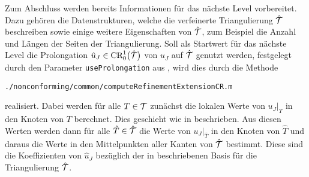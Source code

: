Zum Abschluss werden bereits Informationen für das nächste Level vorbereitet. 
Dazu gehören die Datenstrukturen, welche die verfeinerte Triangulierung
$\hat{\mathcal{T}}$ beschreiben sowie einige weitere Eigenschaften von
$\hat{\mathcal{T}}$, zum Beispiel die Anzahl und Längen der Seiten der Triangulierung.
Soll als Startwert für das nächste Level die Prolongation $\hat
u_J\in\textup{CR}^1_0\big(\hat{\mathcal{T}}\big)$ von $u_J$ auf $\hat{\mathcal{T}}$ genutzt werden,
festgelegt durch den Parameter \texttt{useProlongation} aus
, wird dies durch die Methode
\begin{center}
  \texttt{./nonconforming/common/computeRefinementExtensionCR.m}
\end{center}
realisiert. 
Dabei werden für alle $T\in\mathcal{T}$ zunächst die lokalen Werte von $u_J|_T$ in
den Knoten von $T$ berechnet. 
Dies geschieht wie in  beschrieben.
Aus diesen Werten werden dann für alle $\hat T\in\hat{\mathcal{T}}$ die Werte von
$u_J|_{\hat T}$ in den Knoten von $\hat T$ und daraus die 
Werte in den Mittelpunkten aller Kanten von $\hat{\mathcal{T}}$ bestimmt. 
Diese sind die Koeffizienten von $\hat u_J$ bezüglich der in
 beschriebenen Basis für die Triangulierung
$\hat{\mathcal{T}}$.


